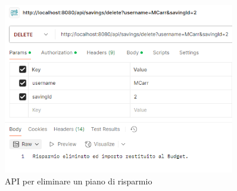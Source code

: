 \begin{figure}[H]
    \centering
    \includegraphics[width=0.9\textwidth]{images/DeleteSavingAPI.png}
    \caption{API per eliminare un piano di risparmio}
    \label{fig:DeleteSavingAPI}
\end{figure}